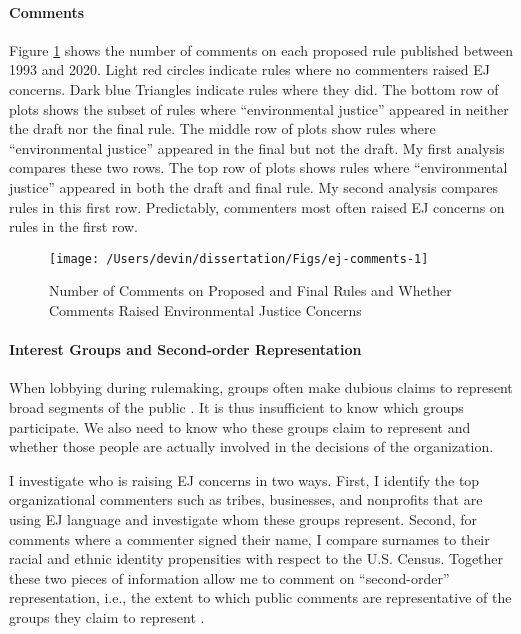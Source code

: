 \documentclass[
      12pt,
        ]{article}
\begin{document}
\hypertarget{comments}{%
\paragraph{Comments}\label{comments}}

Figure \ref{fig:ej-comments} shows the number of comments on each proposed rule published between 1993 and 2020. Light red circles indicate rules where no commenters raised EJ concerns. Dark blue Triangles indicate rules where they did. The bottom row of plots shows the subset of rules where ``environmental justice'' appeared in neither the draft nor the final rule. The middle row of plots show rules where ``environmental justice'' appeared in the final but not the draft. My first analysis compares these two rows. The top row of plots shows rules where ``environmental justice'' appeared in both the draft and final rule. My second analysis compares rules in this first row. Predictably, commenters most often raised EJ concerns on rules in the first row.

\begin{figure}

{\centering \texttt{[image: /Users/devin/dissertation/Figs/ej-comments-1]} 

}

\caption{Number of Comments on Proposed and Final Rules and Whether Comments Raised Environmental Justice Concerns}\label{fig:ej-comments}
\end{figure}

\hypertarget{interest-groups-and-second-order-representation}{%
\paragraph{Interest Groups and Second-order Representation}\label{interest-groups-and-second-order-representation}}

When lobbying during rulemaking, groups often
make dubious claims to represent broad segments of the public \citep{Seifter2016UCLA}. It is thus insufficient to know which groups participate. We
also need to know who these groups claim to represent and whether those people are actually involved in the decisions of the organization.

I investigate who is raising EJ concerns in two ways.
First, I identify the top organizational commenters such as tribes,
businesses, and nonprofits that are using EJ language
and investigate whom these groups represent. Second, for comments where a
commenter signed their name, I compare surnames to their racial and ethnic
identity propensities with respect to the U.S. Census. Together these
two pieces of information allow me to comment on ``second-order'' representation, i.e., the extent to which public comments are
representative of the groups they claim to represent \citep{Seifter2016UCLA}.
\end{document}
